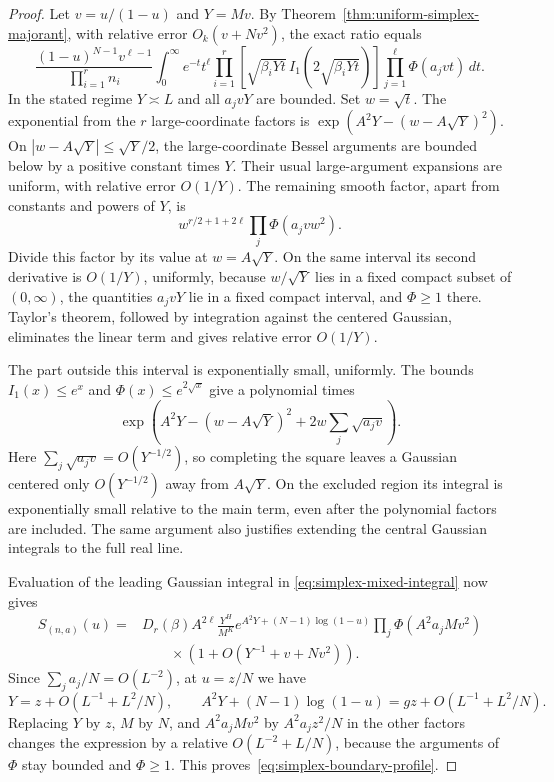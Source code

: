 \begin{proof}
Let $v=u/(1-u)$ and $Y=Mv$. By Theorem~\ref{thm:uniform-simplex-majorant},
with relative error $O_k(v+Nv^2)$, the exact ratio equals
\begin{equation}\label{eq:simplex-mixed-integral}
\frac{(1-u)^{N-1}v^{\ell-1}}{\prod_{i=1}^r n_i}
\int_0^\infty e^{-t}t^\ell
\prod_{i=1}^r\left[\sqrt{\beta_iYt}\,
I_1(2\sqrt{\beta_iYt})\right]
\prod_{j=1}^\ell\Phi(a_jvt)\,dt.
\end{equation}
In the stated regime $Y\asymp L$ and all $a_jvY$ are bounded.
Set $w=\sqrt t$. The exponential from the $r$ large-coordinate factors
is $\exp(A^2Y-(w-A\sqrt Y)^2)$.
On $|w-A\sqrt Y|\le\sqrt Y/2$, the large-coordinate Bessel arguments
are bounded below by a positive constant times $Y$. Their usual
large-argument expansions are uniform, with relative error $O(1/Y)$.
The remaining smooth factor, apart from constants and powers of $Y$, is
\[
w^{r/2+1+2\ell}\prod_j\Phi(a_jvw^2).
\]
Divide this factor by its value at $w=A\sqrt Y$. On the same interval
its second derivative is $O(1/Y)$, uniformly, because $w/\sqrt Y$ lies in a fixed
compact subset of $(0,\infty)$, the quantities $a_jvY$ lie in a fixed
compact interval, and $\Phi\ge1$ there. Taylor's theorem, followed by
integration against the centered Gaussian, eliminates the linear term
and gives relative error $O(1/Y)$.

The part outside this interval is exponentially small, uniformly. The
bounds $I_1(x)\le e^x$ and
$\Phi(x)\le e^{2\sqrt x}$ give a polynomial times
\[
\exp\!\left(A^2Y-(w-A\sqrt Y)^2
+2w\sum_j\sqrt{a_jv}\right).
\]
Here $\sum_j\sqrt{a_jv}=O(Y^{-1/2})$, so completing the square leaves
a Gaussian centered only $O(Y^{-1/2})$ away from $A\sqrt Y$.
On the excluded region its integral is exponentially small relative to
the main term, even after the polynomial factors are included.
The same argument also justifies extending the central Gaussian
integrals to the full real line.

Evaluation of the leading Gaussian integral in
\eqref{eq:simplex-mixed-integral} now gives
\begin{align*}
S_{(n,a)}(u)
={}&D_r(\beta)A^{2\ell}\frac{Y^H}{M^K}
e^{A^2Y+(N-1)\log(1-u)}
\prod_j\Phi(A^2a_jMv^2)\\
&\qquad\times\left(1+O(Y^{-1}+v+Nv^2)\right).
\end{align*}
Since $\sum_j a_j/N=O(L^{-2})$, at $u=z/N$ we have
\[
Y=z+O(L^{-1}+L^2/N),\qquad
A^2Y+(N-1)\log(1-u)=gz+O(L^{-1}+L^2/N).
\]
Replacing $Y$ by $z$, $M$ by $N$, and $A^2a_jMv^2$ by
$A^2a_jz^2/N$ in the other factors changes the expression by a relative
$O(L^{-2}+L/N)$, because the arguments of $\Phi$ stay bounded and
$\Phi\ge1$. This proves~\eqref{eq:simplex-boundary-profile}.


\end{proof}

